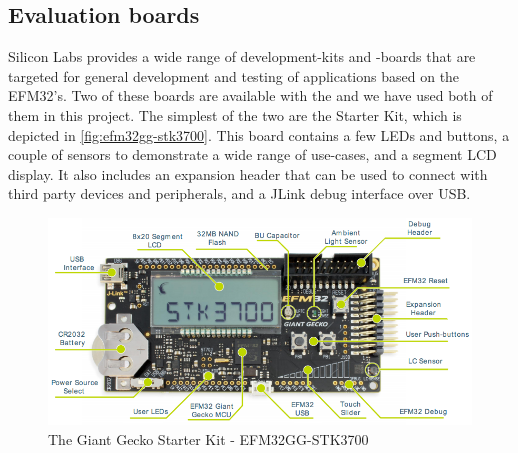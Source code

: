 
\subsection{Evaluation boards}

Silicon Labs provides a wide range of development-kits and -boards that are targeted for general development and testing of applications based on the EFM32's.
Two of these boards are available with the {\gecko} and we have used both of them in this project.
The simplest of the two are the  Starter Kit, which is depicted in \autoref{fig:efm32gg-stk3700}.
This board contains a few LEDs and buttons, a couple of sensors to demonstrate a wide range of use-cases, and a segment LCD display.
It also includes an expansion header that can be used to connect with third party devices and peripherals, and a JLink debug interface over USB.

\begin{figure}[H]
  \begin{center}
    \includegraphics[scale=0.4]{figures/efm32gg-stk3700}
  \end{center}
  \caption{The Giant Gecko Starter Kit - EFM32GG-STK3700 \cite{UM-STK} }
  \label{fig:efm32gg-stk3700}
\end{figure}

